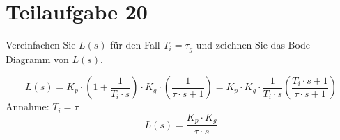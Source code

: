 \section{Teilaufgabe 20}
\begin{aufgabe}
    Vereinfachen Sie $L(s)$ für den Fall $T_i = \tau_g$ und zeichnen Sie das 
    Bode-Diagramm von $L(s)$.
\end{aufgabe}
\[ L(s) = K_p \cdot \left(1 + \frac{1}{T_i \cdot s}\right)
    \cdot K_g \cdot \left(\frac{1}{\tau \cdot s + 1}\right)
    = K_p \cdot K_g \cdot \frac{1}{T_i \cdot s} 
        \left(\frac{T_i \cdot s + 1}{\tau \cdot s + 1}\right)
\]
Annahme: $T_i = \tau$
\[ L(s) = \frac{K_p \cdot K_g}{\tau \cdot s} \]
